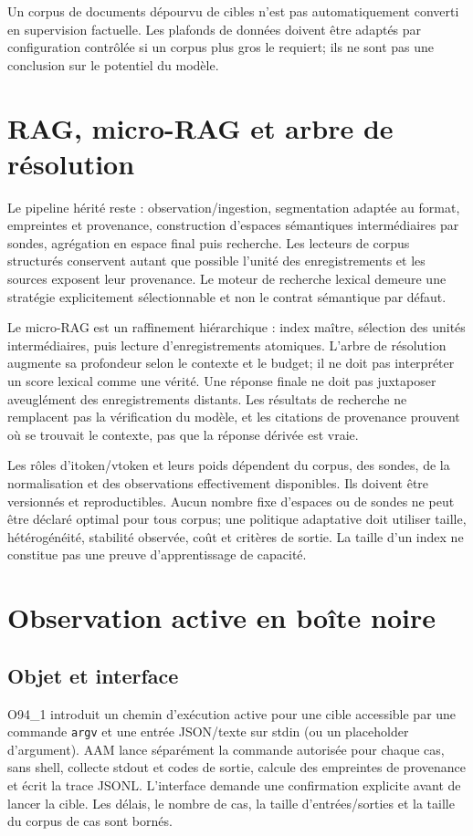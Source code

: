 \documentclass[11pt,a4paper]{article}
\begin{document}
Un corpus de documents dépourvu de cibles n'est pas automatiquement converti en supervision factuelle. Les plafonds de données doivent être adaptés par configuration contrôlée si un corpus plus gros le requiert; ils ne sont pas une conclusion sur le potentiel du modèle.

\section{RAG, micro-RAG et arbre de résolution}
Le pipeline hérité reste : observation/ingestion, segmentation adaptée au format, empreintes et provenance, construction d'espaces sémantiques intermédiaires par sondes, agrégation en espace final puis recherche. Les lecteurs de corpus structurés conservent autant que possible l'unité des enregistrements et les sources exposent leur provenance. Le moteur de recherche lexical demeure une stratégie explicitement sélectionnable et non le contrat sémantique par défaut.

Le micro-RAG est un raffinement hiérarchique : index maître, sélection des unités intermédiaires, puis lecture d'enregistrements atomiques. L'arbre de résolution augmente sa profondeur selon le contexte et le budget; il ne doit pas interpréter un score lexical comme une vérité. Une réponse finale ne doit pas juxtaposer aveuglément des enregistrements distants. Les résultats de recherche ne remplacent pas la vérification du modèle, et les citations de provenance prouvent où se trouvait le contexte, pas que la réponse dérivée est vraie.

Les rôles d'itoken/vtoken et leurs poids dépendent du corpus, des sondes, de la normalisation et des observations effectivement disponibles. Ils doivent être versionnés et reproductibles. Aucun nombre fixe d'espaces ou de sondes ne peut être déclaré optimal pour tous corpus; une politique adaptative doit utiliser taille, hétérogénéité, stabilité observée, coût et critères de sortie. La taille d'un index ne constitue pas une preuve d'apprentissage de capacité.

\section{Observation active en boîte noire}
\subsection{Objet et interface}
O94\_1 introduit un chemin d'exécution active pour une cible accessible par une commande \texttt{argv} et une entrée JSON/texte sur stdin (ou un placeholder d'argument). AAM lance séparément la commande autorisée pour chaque cas, sans shell, collecte stdout et codes de sortie, calcule des empreintes de provenance et écrit la trace JSONL. L'interface demande une confirmation explicite avant de lancer la cible. Les délais, le nombre de cas, la taille d'entrées/sorties et la taille du corpus de cas sont bornés.
\end{document}
